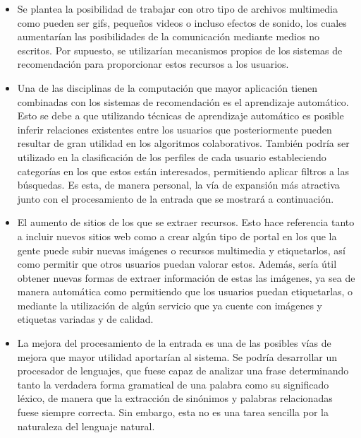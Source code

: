 \begin{itemize}
\item Se plantea la posibilidad de trabajar con otro tipo de archivos multimedia como pueden ser gifs, pequeños videos o incluso efectos de sonido, los cuales aumentarían las posibilidades de la comunicación mediante medios no escritos. Por supuesto, se utilizarían mecanismos propios de los sistemas de recomendación para proporcionar estos recursos a los usuarios.
\item Una de las disciplinas de la computación que mayor aplicación tienen combinadas con los sistemas de recomendación es el aprendizaje automático. Esto se debe a que utilizando técnicas de aprendizaje automático es posible inferir relaciones existentes entre los usuarios que posteriormente pueden resultar de gran utilidad en los algoritmos colaborativos. También podría ser utilizado en la clasificación de los perfiles de cada usuario estableciendo categorías en los que estos están interesados, permitiendo aplicar filtros a las búsquedas. Es esta, de manera personal, la vía de expansión más atractiva junto con el procesamiento de la entrada que se mostrará a continuación.
\item El aumento de sitios de los que se extraer recursos. Esto hace referencia tanto a incluir nuevos sitios web como a crear algún tipo de portal en los que la gente puede subir nuevas imágenes o recursos multimedia y etiquetarlos, así como permitir que otros usuarios puedan valorar estos. Además, sería útil obtener nuevas formas de extraer información de estas las imágenes, ya sea de manera automática como permitiendo que los usuarios puedan etiquetarlas, o mediante la utilización de algún servicio que ya cuente con imágenes y etiquetas variadas y de calidad.
\item La mejora del procesamiento de la entrada es una de las posibles vías de mejora que mayor utilidad aportarían al sistema. Se podría desarrollar un procesador de lenguajes, que fuese capaz de analizar una frase determinando tanto la verdadera forma gramatical de una palabra como su significado léxico, de manera que la extracción de sinónimos y palabras relacionadas fuese siempre correcta. Sin embargo, esta no es una tarea sencilla por la naturaleza del lenguaje natural.
\end{itemize}












































